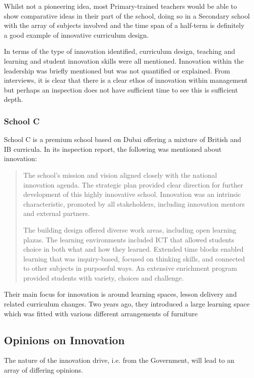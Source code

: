 Whilst not a pioneering idea, most Primary-trained teachers would be able to show comparative ideas in their part of the school, doing so in a Secondary school with the array of subjects involved and the time span of a half-term is definitely a good example of innovative curriculum design.

In terms of the type of innovation identified, curriculum design, teaching and learning and student innovation skills were all mentioned. Innovation within the leadership was briefly mentioned but was not quantified or explained. From interviews, it is clear that there is a clear ethos of innovation within management but perhaps an inspection does not have sufficient time to see this is sufficient depth. 

\subsubsection{School C}
School C is a premium school based on Dubai offering a mixture of British and IB curricula. In its inspection report, the following was mentioned about innovation:

\begin{quote}
The school's mission and vision aligned closely with the national innovation agenda. The strategic plan provided clear direction for further development of this highly innovative school. Innovation was an intrinsic characteristic, promoted by all stakeholders, including innovation mentors and external partners.

The building design offered diverse work areas, including open learning plazas. The learning environments included ICT that allowed students choice in both what and how they learned. Extended time blocks enabled learning that was inquiry-based, focused on thinking skills, and connected to other subjects in purposeful ways. An extensive enrichment program provided students with variety, choices and challenge.
\end{quote}

Their main focus for innovation is around learning spaces, lesson delivery and related curriculum changes. Two years ago, they introduced a large learning space which was fitted with various different arrangements of furniture 


\subsection{Opinions on Innovation}

The nature of the innovation drive, i.e. from the Government, will lead to an array of differing opinions.

